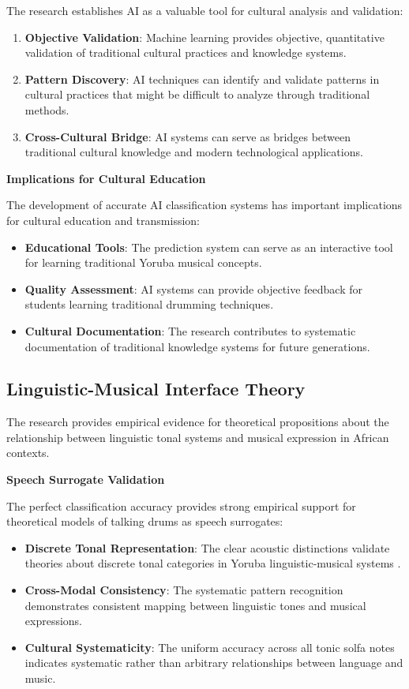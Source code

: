 \documentclass[12pt,a4paper]{article}
\begin{document}
The research establishes AI as a valuable tool for cultural analysis and validation:

\begin{enumerate}
\item \textbf{Objective Validation}: Machine learning provides objective, quantitative validation of traditional cultural practices and knowledge systems.
\item \textbf{Pattern Discovery}: AI techniques can identify and validate patterns in cultural practices that might be difficult to analyze through traditional methods.
\item \textbf{Cross-Cultural Bridge}: AI systems can serve as bridges between traditional cultural knowledge and modern technological applications.
\end{enumerate}

\textbf{Implications for Cultural Education}

The development of accurate AI classification systems has important implications for cultural education and transmission:

\begin{itemize}
\item \textbf{Educational Tools}: The prediction system can serve as an interactive tool for learning traditional Yoruba musical concepts.
\item \textbf{Quality Assessment}: AI systems can provide objective feedback for students learning traditional drumming techniques.
\item \textbf{Cultural Documentation}: The research contributes to systematic documentation of traditional knowledge systems for future generations.
\end{itemize}

\subsection{Linguistic-Musical Interface Theory}

The research provides empirical evidence for theoretical propositions about the relationship between linguistic tonal systems and musical expression in African contexts.

\textbf{Speech Surrogate Validation}

The perfect classification accuracy provides strong empirical support for theoretical models of talking drums as speech surrogates:

\begin{itemize}
\item \textbf{Discrete Tonal Representation}: The clear acoustic distinctions validate theories about discrete tonal categories in Yoruba linguistic-musical systems \citep{akinbo2021}.
\item \textbf{Cross-Modal Consistency}: The systematic pattern recognition demonstrates consistent mapping between linguistic tones and musical expressions.
\item \textbf{Cultural Systematicity}: The uniform accuracy across all tonic solfa notes indicates systematic rather than arbitrary relationships between language and music.
\end{itemize}
\end{document}
